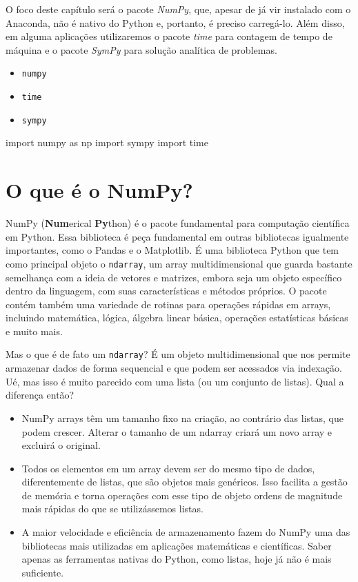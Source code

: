 \documentclass[
  brazilian,
  letterpaper,
  DIV=11,
  numbers=noendperiod]{scrreprt}
\newenvironment{Shaded}{\begin{snugshade}}{\end{snugshade}}
\newcommand{\ImportTok}[1]{\textcolor[rgb]{0.00,0.46,0.62}{#1}}
\newcommand{\NormalTok}[1]{\textcolor[rgb]{0.00,0.23,0.31}{#1}}
\providecommand{\tightlist}{%
  \setlength{\itemsep}{0pt}\setlength{\parskip}{0pt}}
\begin{document}
O foco deste capítulo será o pacote \emph{NumPy}, que, apesar de já vir
instalado com o Anaconda, não é nativo do Python e, portanto, é preciso
carregá-lo. Além disso, em alguma aplicações utilizaremos o pacote
\emph{time} para contagem de tempo de máquina e o pacote \emph{SymPy}
para solução analítica de problemas.

\begin{itemize}
\tightlist
\item
  \texttt{numpy}
\item
  \texttt{time}
\item
  \texttt{sympy}
\end{itemize}

\begin{Shaded}
\begin{Highlighting}[]
\ImportTok{import}\NormalTok{ numpy }\ImportTok{as}\NormalTok{ np}
\ImportTok{import}\NormalTok{ sympy}
\ImportTok{import}\NormalTok{ time}
\end{Highlighting}
\end{Shaded}

\section{O que é o NumPy?}\label{o-que-uxe9-o-numpy}

NumPy (\textbf{Num}erical \textbf{Py}thon) é o pacote fundamental para
computação científica em Python. Essa biblioteca é peça fundamental em
outras bibliotecas igualmente importantes, como o Pandas e o Matplotlib.
É uma biblioteca Python que tem como principal objeto o
\texttt{ndarray}, um array multidimensional que guarda bastante
semelhança com a ideia de vetores e matrizes, embora seja um objeto
específico dentro da linguagem, com suas características e métodos
próprios. O pacote contém também uma variedade de rotinas para operações
rápidas em arrays, incluindo matemática, lógica, álgebra linear básica,
operações estatísticas básicas e muito mais.

Mas o que é de fato um \texttt{ndarray}? É um objeto multidimensional
que nos permite armazenar dados de forma sequencial e que podem ser
acessados via indexação. Ué, mas isso é muito parecido com uma lista (ou
um conjunto de listas). Qual a diferença então?

\begin{itemize}
\item
  NumPy arrays têm um tamanho fixo na criação, ao contrário das listas,
  que podem crescer. Alterar o tamanho de um ndarray criará um novo
  array e excluirá o original.
\item
  Todos os elementos em um array devem ser do mesmo tipo de dados,
  diferentemente de listas, que são objetos mais genéricos. Isso
  facilita a gestão de memória e torna operações com esse tipo de objeto
  ordens de magnitude mais rápidas do que se utilizássemos listas.
\item
  A maior velocidade e eficiência de armazenamento fazem do NumPy uma
  das bibliotecas mais utilizadas em aplicações matemáticas e
  científicas. Saber apenas as ferramentas nativas do Python, como
  listas, hoje já não é mais suficiente.
\end{itemize}
\end{document}
